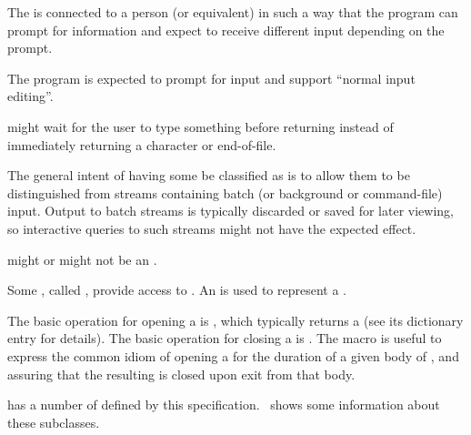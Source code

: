 \beginlist

\itemitem{\bull} 
  The  is connected to a person (or equivalent) in such a way
  that the program can prompt for information and expect to receive different
  input depending on the prompt.

\itemitem{\bull}
  The program is expected to prompt for input and support ``normal input editing''.

\itemitem{\bull} 
   might wait for the user to type something before returning
  instead of immediately returning a character or end-of-file. 

\endlist 

The general intent of having some  be classified as
 is to allow them to be distinguished from
streams containing batch (or background or command-file) input.
Output to batch streams is typically discarded or saved for later viewing, 
so interactive queries to such streams might not have the expected effect.

 might or might not be an .

\endsubsubsubsection%


Some , called , provide access to .
An   is used to represent a .

The basic operation for opening a  is ,
which typically returns a  
(see its dictionary entry for details).
The basic operation for closing a  is .
The macro  is useful 
to express the common idiom of opening a  
for the duration of a given body of , 
and assuring that the resulting  is closed upon exit from that body.

\endsubsubsubsection%

\endsubsubsection%


 has a number of  defined 
by this specification.  \Thenextfigure\ shows some information 
about these subclasses.

